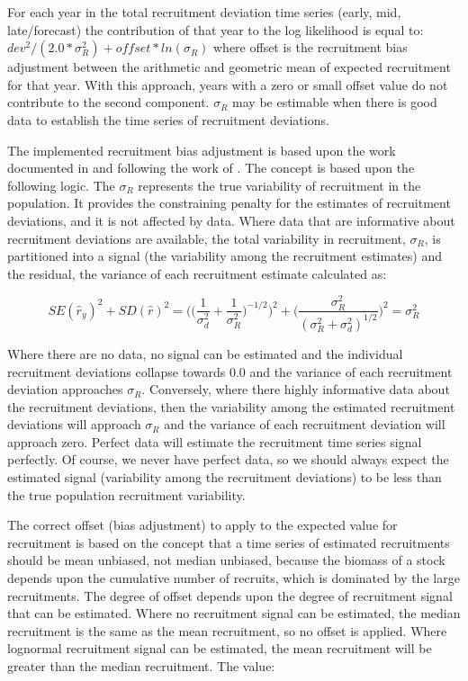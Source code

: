\hypertarget{RecBias}{}
For each year in the total recruitment deviation time series (early, mid, late/forecast) the contribution of that year to the log likelihood is equal to: $dev^2/(2.0*\sigma^2_R)+offset*ln(\sigma_R)$ where offset is the recruitment bias adjustment between the arithmetic and geometric mean of expected recruitment for that year. With this approach, years with a zero or small offset value do not contribute to the second component. $\sigma_R$ may be estimable when there is good data to establish the time series of recruitment deviations.

The implemented recruitment bias adjustment is based upon the work documented in \citet{methot-adjusting-2011} and following the work of \citet{maunder-estimation-2003}. The concept is based upon the following logic. The $\sigma_R$ represents the true variability of recruitment in the population. It provides the constraining penalty for the estimates of recruitment deviations, and it is not affected by data. Where data that are informative about recruitment deviations are available, the total variability in recruitment, $\sigma_R$, is partitioned into a signal (the variability among the recruitment estimates) and the residual, the variance of each recruitment estimate calculated as:

\begin{equation}
SE(\hat{r}_y)^2 + SD(\hat{r})^2=\Bigg( \bigg( \frac{1}{\sigma^2_d}+\frac{1}{\sigma^2_R}\bigg)^{-1/2}\Bigg)^2+\Bigg( \frac{\sigma^2_R}{(\sigma^2_R+\sigma^2_d)^{1/2}}\Bigg)^2=\sigma^2_R
\end{equation}

Where there are no data, no signal can be estimated and the individual recruitment deviations collapse towards 0.0 and the variance of each recruitment deviation approaches $\sigma_R$. Conversely, where there highly informative data about the recruitment deviations, then the variability among the estimated recruitment deviations will approach $\sigma_R$ and the variance of each recruitment deviation will approach zero. Perfect data will estimate the recruitment time series signal perfectly. Of course, we never have perfect data, so we should always expect the estimated signal (variability among the recruitment deviations) to be less than the true population recruitment variability.


The correct offset (bias adjustment) to apply to the expected value for recruitment is based on the concept that a time series of estimated recruitments should be mean unbiased, not median unbiased, because the biomass of a stock depends upon the cumulative number of recruits, which is dominated by the large recruitments. The degree of offset depends upon the degree of recruitment signal that can be estimated. Where no recruitment signal can be estimated, the median recruitment is the same as the mean recruitment, so no offset is applied. Where lognormal recruitment signal can be estimated, the mean recruitment will be greater than the median recruitment. The value:

